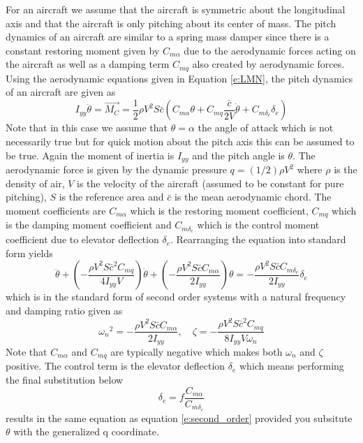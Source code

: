 For an aircraft we assume that the aircraft is symmetric about the longitudinal axis and that the aircraft is only pitching about its center of mass. The pitch dynamics of an aircraft are similar to a spring mass damper since there is a constant restoring moment given by $C_{m\alpha}$ due to the aerodynamic forces acting on the aircraft as well as a damping term $C_{mq}$ also created by aerodynamic forces. Using the aerodynamic equations given in Equation \ref{e:LMN}, the pitch dynamics of an aircraft are given as
\begin{equation}
    I_{yy}\ddot{\theta} = \vec{M_C} = \frac{1}{2}\rho V^2 S \bar{c} (C_{m\alpha}\theta + C_{mq}\frac{\bar{c}}{2V}\dot{\theta} + C_{m\delta_e}\delta_e)
\end{equation}
Note that in this case we assume that $\theta=\alpha$ the angle of attack which is not necessarily true but for quick motion about the pitch axis this can be assumed to be true. Again the moment of inertia is $I_{yy}$ and the pitch angle is $\theta$. The aerodynamic force is given by the dynamic pressure $q = (1/2)\rho V^2$ where $\rho$ is the density of air, $V$ is the velocity of the aircraft (assumed to be constant for pure pitching), $S$ is the reference area and $\bar{c}$ is the mean aerodynamic chord. The moment coefficients are $C_{m\alpha}$ which is the restoring moment coefficient, $C_{mq}$ which is the damping moment coefficient and $C_{m\delta_e}$ which is the control moment coefficient due to elevator deflection $\delta_e$. Rearranging the equation into standard form yields
\begin{equation}
    \ddot{\theta} + \left(-\frac{\rho V^2 S \bar{c}^2 C_{mq}}{4I_{yy} V}\right)\dot{\theta} + \left(-\frac{\rho V^2 S \bar{c} C_{m\alpha}}{2I_{yy}}\right)\theta = -\frac{\rho V^2 S \bar{c} C_{m\delta_e}}{2I_{yy}}\delta_e
\end{equation}
which is in the standard form of second order systems with a natural frequency and damping ratio given as 
\begin{equation}
    {\omega_n}^2 = -\frac{\rho V^2 S \bar{c} C_{m\alpha}}{2I_{yy}}, \quad \zeta = -\frac{\rho V^2 S \bar{c}^2 C_{mq}}{8I_{yy} V {\omega_n}}
\end{equation}
Note that $C_{m\alpha}$ and $C_{mq}$ are typically negative which makes both $\omega_n$ and $\zeta$ positive. The control term is the elevator deflection $\delta_e$ which means performing the final substitution below
\begin{equation}
    \delta_e = f \frac{C_{m\alpha}}{C_{m\delta_e}}
\end{equation}
results in the same equation as equation \ref{e:second_order} provided you subsitute $\theta$ with the generalized q coordinate.

